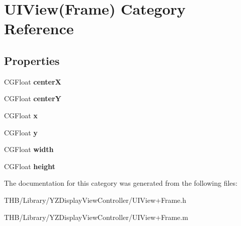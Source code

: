 \hypertarget{category_u_i_view_07_frame_08}{}\section{U\+I\+View(Frame) Category Reference}
\label{category_u_i_view_07_frame_08}
\subsection*{Properties}
\begin{DoxyCompactItemize}
\item 
\mbox{\label{category_u_i_view_07_frame_08_aa98b4849d885f8668ee615331bb4291b}} 
C\+G\+Float {\bfseries centerX}
\item 
\mbox{\label{category_u_i_view_07_frame_08_a93e4337477743bceca369529db955b9d}} 
C\+G\+Float {\bfseries centerY}
\item 
\mbox{\label{category_u_i_view_07_frame_08_a1a56c5036f71b4b43fd219c32db9dbce}} 
C\+G\+Float {\bfseries x}
\item 
\mbox{\label{category_u_i_view_07_frame_08_a6173968fadc0a693ac8dfc902077c823}} 
C\+G\+Float {\bfseries y}
\item 
\mbox{\label{category_u_i_view_07_frame_08_a617fe58f93e010004635e9704e11e381}} 
C\+G\+Float {\bfseries width}
\item 
\mbox{\label{category_u_i_view_07_frame_08_ab51d4c0d34a733f50f977f5aedb9f33f}} 
C\+G\+Float {\bfseries height}
\end{DoxyCompactItemize}


The documentation for this category was generated from the following files\+:\begin{DoxyCompactItemize}
\item 
T\+H\+B/\+Library/\+Y\+Z\+Display\+View\+Controller/U\+I\+View+\+Frame.\+h\item 
T\+H\+B/\+Library/\+Y\+Z\+Display\+View\+Controller/U\+I\+View+\+Frame.\+m\end{DoxyCompactItemize}
